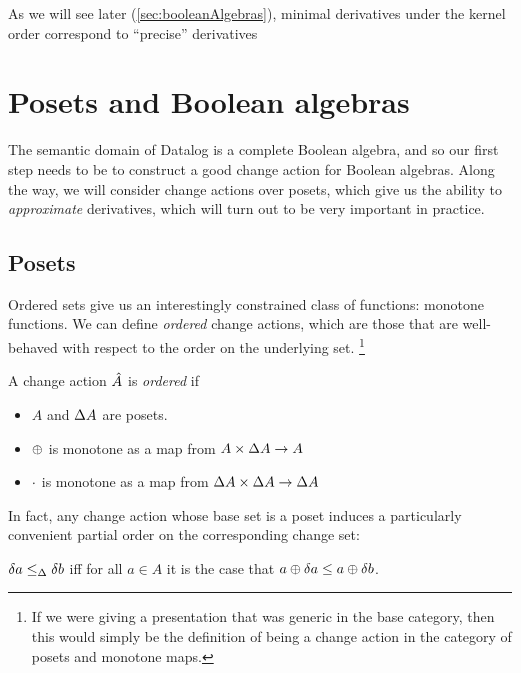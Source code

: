 As we will see later (\cref{sec:booleanAlgebras}), minimal derivatives under
the kernel order correspond to ``precise'' derivatives

\section{Posets and Boolean algebras}
\label{sec:moreStructures}


The semantic domain of Datalog is a complete Boolean algebra, and so our first step needs
to be to construct a good change action for Boolean algebras. Along the way, we
will consider change actions over posets, which give us the ability to
\emph{approximate} derivatives, which will turn out to be very important in practice.

\subsection{Posets}

Ordered sets give us an interestingly constrained class of functions: monotone
functions. We can define \emph{ordered} change actions, which are those that
are well-behaved with respect to the order on the underlying set.
\footnote{If we were giving a presentation that was
generic in the base category, then this would simply be the definition of being
a change action in the category of posets and monotone maps.}

\begin{defn}
  A change action $\hat{A}$ is \emph{ordered} if
  \begin{itemize}
    \item $A$ and $\Delta A$ are posets.
    \item $\oplus$ is monotone as a map from $A \times \Delta A \rightarrow A$
    \item $\cdot$ is monotone as a map from $\Delta A \times \Delta A \rightarrow \Delta A$
  \end{itemize}
\end{defn}

In fact, any change action whose base set is a poset induces a particularly convenient partial order
on the corresponding change set:

\begin{defn}
  $\delta a \leq_\Delta \delta b$ iff for all $a \in A$ it is the case that
  $a \oplus \delta a \leq a \oplus \delta b$.
\end{defn}

